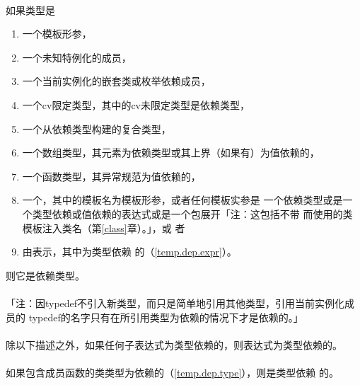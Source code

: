 \paragraph{}
如果类型是
\begin{enumerate}
  \item{一个模板形参，}
  \item{一个未知特例化的成员，}
  \item{一个当前实例化的嵌套类或枚举依赖成员，}
  \item{一个cv限定类型，其中的cv未限定类型是依赖类型，}
  \item{一个从依赖类型构建的复合类型，}
  \item{一个数组类型，其元素为依赖类型或其上界（如果有）为值依赖的，}
  \item{一个函数类型，其异常规范为值依赖的，}
  \item{一个，其中的模板名为模板形参，或者任何模板实参是
    一个依赖类型或是一个类型依赖或值依赖的表达式或是一个包展开「注：这包括不带
    而使用的类模板注入类名（第\ref{class}章）。」，或
    者}
  \item{由\tm{)}表示，其中为类型依赖
    的（\ref{temp.dep.expr}）。}
\end{enumerate}
则它是依赖类型。

\paragraph{}
「注：因typedef不引入新类型，而只是简单地引用其他类型，引用当前实例化成员的
typedef的名字只有在所引用类型为依赖的情况下才是依赖的。」

\paragraph{}
除以下描述之外，如果任何子表达式为类型依赖的，则表达式为类型依赖的。

\paragraph{}
如果包含成员函数的类类型为依赖的（\ref{temp.dep.type}），则是类型依赖
的。

